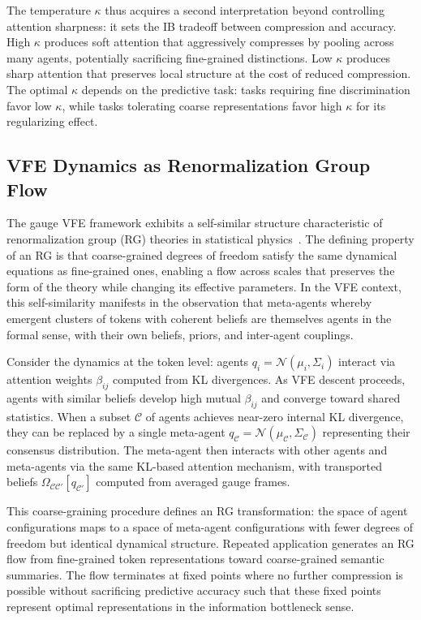 \documentclass[twoside,11pt]{article}
\begin{document}
The temperature $\kappa$ thus acquires a second interpretation beyond controlling attention sharpness: it sets the IB tradeoff between compression and accuracy. High $\kappa$ produces soft attention that aggressively compresses by pooling across many agents, potentially sacrificing fine-grained distinctions. Low $\kappa$ produces sharp attention that preserves local structure at the cost of reduced compression. The optimal $\kappa$ depends on the predictive task: tasks requiring fine discrimination favor low $\kappa$, while tasks tolerating coarse representations favor high $\kappa$ for its regularizing effect.

\subsection{VFE Dynamics as Renormalization Group Flow}

The gauge VFE framework exhibits a self-similar structure characteristic of renormalization group (RG) theories in statistical physics~\citep{wilson1974renormalization}. The defining property of an RG is that coarse-grained degrees of freedom satisfy the same dynamical equations as fine-grained ones, enabling a flow across scales that preserves the form of the theory while changing its effective parameters. In the VFE context, this self-similarity manifests in the observation that meta-agents whereby emergent clusters of tokens with coherent beliefs are themselves agents in the formal sense, with their own beliefs, priors, and inter-agent couplings.

Consider the dynamics at the token level: agents $q_i = \mathcal{N}(\mu_i, \Sigma_i)$ interact via attention weights $\beta_{ij}$ computed from KL divergences. As VFE descent proceeds, agents with similar beliefs develop high mutual $\beta_{ij}$ and converge toward shared statistics. When a subset $\mathcal{C}$ of agents achieves near-zero internal KL divergence, they can be replaced by a single meta-agent $q_{\mathcal{C}} = \mathcal{N}(\mu_{\mathcal{C}}, \Sigma_{\mathcal{C}})$ representing their consensus distribution. The meta-agent then interacts with other agents and meta-agents via the same KL-based attention mechanism, with transported beliefs $\Omega_{\mathcal{C}\mathcal{C}'}[q_{\mathcal{C}'}]$ computed from averaged gauge frames.

This coarse-graining procedure defines an RG transformation: the space of agent configurations maps to a space of meta-agent configurations with fewer degrees of freedom but identical dynamical structure. Repeated application generates an RG flow from fine-grained token representations toward coarse-grained semantic summaries. The flow terminates at fixed points where no further compression is possible without sacrificing predictive accuracy such that these fixed points represent optimal representations in the information bottleneck sense.
\end{document}
